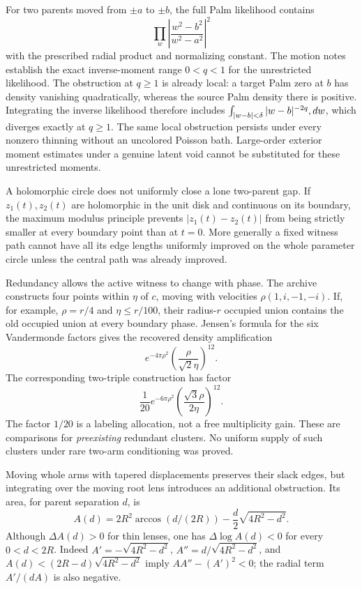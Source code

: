 \documentclass[11pt,a4paper]{article}
\theoremstyle{definition}
\theoremstyle{remark}
\numberwithin{equation}{section}
\begin{document}
For two parents moved from $\pm a$ to $\pm b$, the full Palm likelihood
contains
\[
 \prod_{w}\left|\frac{w^2-b^2}{w^2-a^2}\right|^2
\]
with the prescribed radial product and normalizing constant.  The
motion notes establish the exact inverse-moment range $0<q<1$ for
the unrestricted likelihood.  The obstruction at $q\geq1$ is already
local: a target Palm zero at $b$ has density vanishing quadratically,
whereas the source Palm density there is positive.  Integrating the
inverse likelihood therefore includes
$\int_{|w-b|<\delta}|w-b|^{-2q}\\,dw$, which diverges exactly at
$q\geq1$.  The same local obstruction persists under every nonzero
thinning without an uncolored Poisson bath.  Large-order exterior
moment estimates under a genuine latent void cannot be substituted
for these unrestricted moments.

A holomorphic circle does not uniformly close a lone two-parent gap.
If $z_1(t),z_2(t)$ are holomorphic in the unit disk and continuous on
its boundary, the maximum modulus principle prevents
$|z_1(t)-z_2(t)|$ from being strictly smaller at every boundary point
than at $t=0$.  More generally a fixed witness path cannot have all
its edge lengths uniformly improved on the whole parameter circle
unless the central path was already improved.

Redundancy allows the active witness to change with phase.  The archive
constructs four points within $\eta$ of $c$, moving with velocities
$\rho(1,i,-1,-i)$.  If, for example, $\rho=r/4$ and
$\eta\leq r/100$, their radius-$r$ occupied union contains the old
occupied union at every boundary phase.  Jensen's formula for the six
Vandermonde factors gives the recovered density amplification
\[
 e^{-4\pi\rho^2}
 \left(\frac{\rho}{\sqrt2\eta}\right)^{12}.
\]
The corresponding two-triple construction has factor
\[
 \frac1{20}e^{-6\pi\rho^2}
 \left(\frac{\sqrt3\rho}{2\eta}\right)^{12}.
\]
The factor $1/20$ is a labeling allocation, not a free multiplicity
gain.  These are comparisons for \emph{preexisting} redundant clusters.
No uniform supply of such clusters under rare two-arm conditioning was
proved.

Moving whole arms with tapered displacements preserves their slack
edges, but integrating over the moving root lens introduces an
additional obstruction.  Its area, for parent separation $d$, is
\[
 A(d)=2R^2\arccos(d/(2R))-\frac d2\sqrt{4R^2-d^2}.
\]
Although $\Delta A(d)>0$ for thin lenses, one has
$\Delta\log A(d)<0$ for every $0<d<2R$.  Indeed
$A'=-\sqrt{4R^2-d^2}$, $A''=d/\sqrt{4R^2-d^2}$, and
$A(d)<(2R-d)\sqrt{4R^2-d^2}$ imply $AA''-(A')^2<0$;
the radial term $A'/(dA)$ is also negative.
\end{document}
